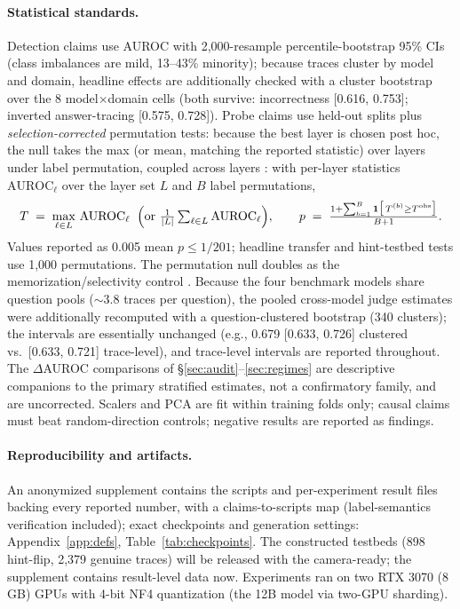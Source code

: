\documentclass{article}
\begin{document}
\paragraph{Statistical standards.} Detection claims use AUROC with 2{,}000-resample percentile-bootstrap 95\% CIs (class imbalances are mild, 13--43\% minority); because traces cluster by model and domain, headline effects are additionally checked with a cluster bootstrap over the 8 model$\times$domain cells (both survive: incorrectness [0.616, 0.753]; inverted answer-tracing [0.575, 0.728]). Probe claims use held-out splits plus \emph{selection-corrected} permutation tests: because the best layer is chosen post hoc, the null takes the max (or mean, matching the reported statistic) over layers under label permutation, coupled across layers \citep{nichols2002nonparametric}: with per-layer statistics $\mathrm{AUROC}_\ell$ over the layer set $L$ and $B$ label permutations,
\begin{equation}\label{eq:perm}
T \;=\; \max_{\ell\in L}\,\mathrm{AUROC}_\ell \;\;\Bigl(\text{or } \tfrac{1}{\lvert L\rvert}\textstyle\sum_{\ell\in L} \mathrm{AUROC}_\ell\Bigr), \qquad
p \;=\; \frac{1 + \sum_{b=1}^{B}\mathbf{1}\bigl[\,T^{(b)} \ge T^{\mathrm{obs}}\bigr]}{B+1}.
\end{equation} Values reported as 0.005 mean $p \leq 1/201$; headline transfer and hint-testbed tests use 1{,}000 permutations. The permutation null doubles as the memorization/selectivity control \citep{hewitt2019control,belinkov2022probing}. Because the four benchmark models share question pools ($\sim$3.8 traces per question), the pooled cross-model judge estimates were additionally recomputed with a question-clustered bootstrap (340 clusters); the intervals are essentially unchanged (e.g., 0.679 [0.633, 0.726] clustered vs.\ [0.633, 0.721] trace-level), and trace-level intervals are reported throughout. The $\Delta$AUROC comparisons of \S\ref{sec:audit}--\ref{sec:regimes} are descriptive companions to the primary stratified estimates, not a confirmatory family, and are uncorrected. Scalers and PCA are fit within training folds only; causal claims must beat random-direction controls; negative results are reported as findings.


\paragraph{Reproducibility and artifacts.} An anonymized supplement contains the scripts and per-experiment result files backing every reported number, with a claims-to-scripts map (label-semantics verification included); exact checkpoints and generation settings: Appendix~\ref{app:defs}, Table~\ref{tab:checkpoints}. The constructed testbeds (898 hint-flip, 2{,}379 genuine traces) will be released with the camera-ready; the supplement contains result-level data now. Experiments ran on two RTX 3070 (8\,GB) GPUs with 4-bit NF4 quantization \citep{dettmers2023qlora} (the 12B model via two-GPU sharding).
\end{document}
